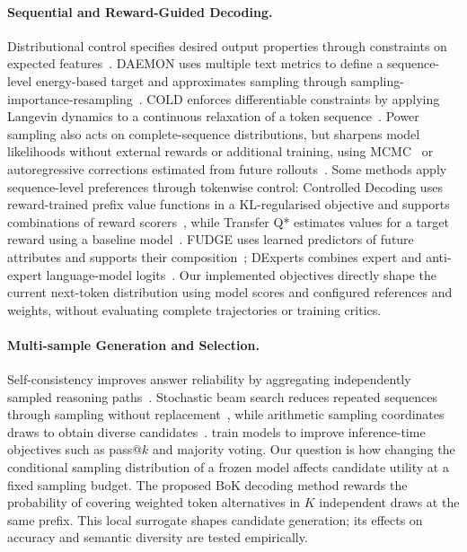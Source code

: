 \documentclass{article} %
\begin{document}
\paragraph{Sequential and Reward-Guided Decoding.}
Distributional control specifies desired output properties through constraints on expected features~\citep{khalifa2020distributional}.
DAEMON uses multiple text metrics to define a sequence-level energy-based target and approximates sampling through sampling-importance-resampling~\citep{ji2024daemon}.
COLD enforces differentiable constraints by applying Langevin dynamics to a continuous relaxation of a token sequence~\citep{qin2022cold}.
Power sampling also acts on complete-sequence distributions, but sharpens model likelihoods without external rewards or additional training, using MCMC~\citep{karan2026reasoning} or autoregressive corrections estimated from future rollouts~\citep{ji2026scalablepower}.
Some methods apply sequence-level preferences through tokenwise control: Controlled Decoding uses reward-trained prefix value functions in a KL-regularised objective and supports combinations of reward scorers~\citep{mudgal2023controlled}, while Transfer Q* estimates values for a target reward using a baseline model~\citep{chakraborty2024transferq}.
FUDGE uses learned predictors of future attributes and supports their composition~\citep{yang2021fudge}; DExperts combines expert and anti-expert language-model logits~\citep{liu2021dexperts}.
Our implemented objectives directly shape the current next-token distribution using model scores and configured references and weights, without evaluating complete trajectories or training critics.

\paragraph{Multi-sample Generation and Selection.}
Self-consistency improves answer reliability by aggregating independently sampled reasoning paths~\citep{wang2023selfconsistencyimproveschainthought}.
Stochastic beam search reduces repeated sequences through sampling without replacement~\citep{kool2019stochastic}, while arithmetic sampling coordinates draws to obtain diverse candidates~\citep{vilnis2023arithmetic}.
\citet{tang2025inference} train models to improve inference-time objectives such as pass@$k$ and majority voting.
Our question is how changing the conditional sampling distribution of a frozen model affects candidate utility at a fixed sampling budget.
The proposed BoK decoding method rewards the probability of covering weighted token alternatives in $K$ independent draws at the same prefix.
This local surrogate shapes candidate generation; its effects on accuracy and semantic diversity are tested empirically.
\end{document}
